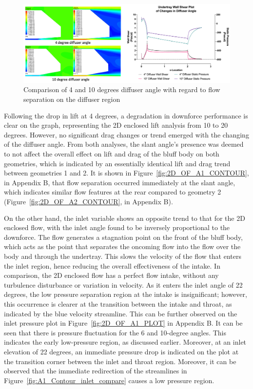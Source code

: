 \begin{figure}[!htb]
    \centering
    \includegraphics[scale=0.52]{Figures/2D_OF/10_4_O_COMPARE CONTOUR.PNG}
    \caption{Comparison of 4 and 10 degrees diffuser angle with regard to flow separation on the diffuser region }
    \label{fig:2D_OF_10_4_Contour_compare}
\end{figure}

\noindent Following the drop in lift at 4 degrees, a degradation in downforce performance is clear on the graph, representing the 2D enclosed lift analysis from 10 to 20 degrees. However, no significant drag changes or trend emerged with the changing of the diffuser angle. From both analyses, the slant angle's presence was deemed to not affect the overall effect on lift and drag of the bluff body on both geometries, which is indicated by an essentially identical lift and drag trend between geometries 1 and 2. It is shown in Figure~\ref{fig:2D_OF_A1_CONTOUR}, in Appendix B, that flow separation occurred immediately at the slant angle, which indicates similar flow features at the rear compared to geometry 2 (Figure~\ref{fig:2D_OF_A2_CONTOUR}, in Appendix B). 

\noindent On the other hand, the inlet variable shows an opposite  trend to that for the 2D enclosed flow, with the inlet angle found to be inversely proportional to the downforce. The flow generates a stagnation point on the front of the bluff body, which acts as the point that separates the oncoming flow into the flow over the body and through the undertray. This slows the velocity of the flow that enters the inlet region, hence reducing the overall effectiveness of the intake. In comparison, the 2D enclosed flow has a perfect flow intake, without any turbulence disturbance or variation in velocity. As it enters the inlet angle of 22 degrees, the low pressure separation region at the intake is insignificant; however, this occurrence is clearer at the transition between the intake and throat, as indicated by the blue velocity streamline. This can be further observed on the inlet pressure plot in Figure~\ref{fig:2D_OF_A1_PLOT} in Appendix B. It can be seen that there is pressure fluctuation for the 6 and 10-degree angles. This indicates the early low-pressure region, as discussed earlier. Moreover, at an inlet elevation of 22 degrees, an immediate pressure drop is indicated on the plot at the transition corner between the inlet and throat region. Moreover, it can be observed that the immediate redirection of the streamlines in Figure~\ref{fig:A1_Contour_inlet_compare} causes a low pressure region.

